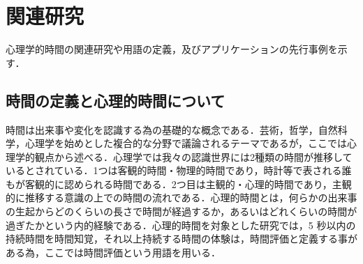 \chapter{関連研究}
心理学的時間の関連研究や用語の定義，及びアプリケーションの先行事例を示す．

\section{時間の定義と心理的時間について}
時間は出来事や変化を認識する為の基礎的な概念である．芸術，哲学，自然科学，心理学を始めとした複合的な分野で議論されるテーマであるが，ここでは心理学的観点から述べる．心理学では我々の認識世界には2種類の時間が推移しているとされている．1つは客観的時間・物理的時間であり，時計等で表される誰もが客観的に認められる時間である．2つ目は主観的・心理的時間であり，主観的に推移する意識の上での時間の流れである．心理的時間とは，何らかの出来事の生起からどのくらいの長さで時間が経過するか，あるいはどれくらいの時間が過ぎたかという内的経験である\cite{Meck2005}．心理的時間を対象とした研究では，5 秒以内の持続時間を時間知覚，それ以上持続する時間の体験は，時間評価と定義する事がある為\cite{Kato2005}，ここでは時間評価という用語を用いる．

